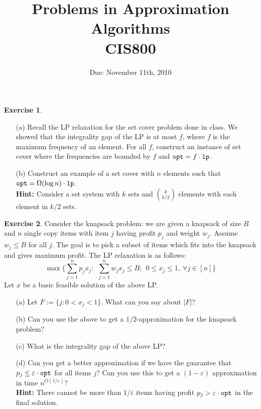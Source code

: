 \documentclass[11pt]{article}
\theoremstyle{definition}
\newtheorem{exercise}{Exercise}
\def\eps{\varepsilon}
\def\opt{{\tt opt}}
\def\lp{{\tt lp}}
\begin{document}
\title{{\bf Problems in Approximation Algorithms} \\ 
{\normalsize CIS800}}
\date{Due: November 11th, 2010}
\maketitle
\begin{exercise}
\begin{itemize}
\item[(a)]
Recall the LP relaxation for the set cover problem done in class.
We showed that the integrality gap of the LP is at most $f$, where 
$f$ is the maximum frequency of an element. For all $f$, 
construct an instance of set cover where the frequencies are bounded by $f$
and $\opt = f\cdot \lp$.
\item[(b)] Construct an example of a set cover with $n$ elements such that 
$\opt = \Omega(\log n)\cdot \lp$. \\{\bf Hint:} Consider a set system with $k$ sets 
and $k\choose{k/2}$ elements with each element in $k/2$ sets.
\end{itemize}
\end{exercise}
\vspace{2ex}
\begin{exercise}
Consider the knapsack problem: we are given a knapsack of size $B$ and $n$ single copy items 
with item $j$ having profit $p_j$ and weight $w_j$. Assume $w_j \le B$ for all $j$.
The goal is to pick a subset of items which fits into the knapsack and gives maximum profit. 
The LP relaxation is as follows:
$$\max \{\sum_{j=1}^n p_jx_j: ~~ \sum_{j=1}^n w_jx_j \le B; ~~ 0\le x_j \le 1, ~\forall j\in [n] \}$$
Let $x$ be a basic feasible solution of the above LP.
\begin{enumerate}
\item[(a)] Let $F := \{j: 0 < x_j < 1\}$. What can you say about $|F|$?
\item[(b)] Can you use the above to get a $1/2$-approximation for the knapsack problem?
\item[(c)] What is the integrality gap of the above LP?
\item[(d)] Can you get a better approximation if we have the guarantee that $p_j \le \eps\cdot \opt$ for all items $j$? Can you use this to get a $(1-\eps)$ approximation in time $n^{O\left(1/\eps\right)}$? \\
\noindent
{\bf Hint:} There cannot be more than $1/\eps$ items having profit $p_j > \eps\cdot\opt$ in the final solution.
\end{enumerate}
\end{exercise}
\end{document}
